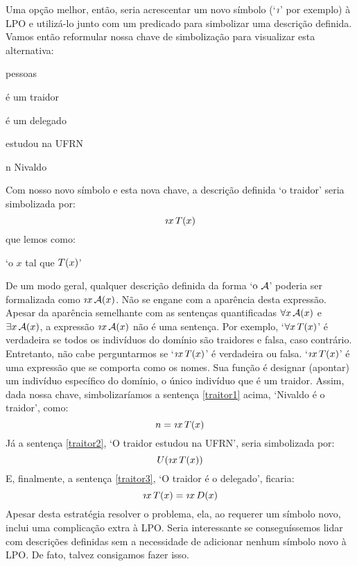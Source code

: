Uma opção melhor, então, seria acrescentar um novo símbolo (`$\maththe$' por exemplo) à LPO e utilizá-lo junto com um predicado  para simbolizar uma descrição definida.
Vamos então reformular nossa chave de simbolização para visualizar esta alternativa:
\begin{center}
	\begin{ekey}
		\item[\text{domínio}] pessoas
		\item[\atom{T}{x}]  é um traidor
		\item[\atom{D}{x}]  é um delegado
		\item[\atom{U}{x}]  estudou na UFRN
		\item[n] Nivaldo
	\end{ekey}
\end{center}
Com nosso novo símbolo e esta nova chave, a descrição definida `o traidor' seria simbolizada por:
$$\maththe x\, \atom{T}{x}$$
que lemos como:
\begin{center}
	`o $x$ tal que $\mathord{T}(x)$'
\end{center}
De um modo geral, qualquer descrição definida da forma `$\text{o}\ \mathcal{A}$' poderia ser formalizada como
$\maththe x\, \atom{\meta{A}}{x}$.
Não se engane com a aparência desta expressão.
Apesar da aparência semelhante com as sentenças quantificadas $\forall x\, \mathord{\mathcal{A}}(x)$ e $\exists x\, \mathord{\mathcal{A}}(x)$, a expressão $\maththe x\, \atom{\meta{A}}{x}$ não é uma sentença.
Por exemplo, `$\forall x\, \mathord{T}(x)$' é verdadeira se todos os indivíduos do domínio são traidores e falsa, caso contrário.
Entretanto, não cabe perguntarmos se  `$\maththe x\, \atom{T}{x}$' é verdadeira ou falsa.
`$\maththe x\, \atom{T}{x}$' é uma expressão que se comporta como os nomes.
Sua função é designar (apontar) um indivíduo específico do domínio, o único indivíduo que é um traidor.
Assim, dada nossa chave, simbolizaríamos a sentença \ref{traitor1} acima, `Nivaldo é o traidor', como:
$$n = \maththe x\, \atom{T}{x}$$
Já a sentença \ref{traitor2}, `O traidor estudou na UFRN', seria simbolizada por:
$$\atom{U}{\maththe x\,\atom{T}{x}}$$
E, finalmente, a sentença \ref{traitor3}, `O traidor é o delegado', ficaria:
$$\maththe x\, \atom{T}{x} = \maththe x\, \atom{D}{x}$$
Apesar desta estratégia resolver o problema, ela, ao requerer um símbolo novo, inclui uma complicação extra à LPO.
Seria interessante se conseguíssemos lidar com descrições definidas sem a necessidade de adicionar nenhum símbolo novo à LPO.
De fato, talvez consigamos fazer isso.


